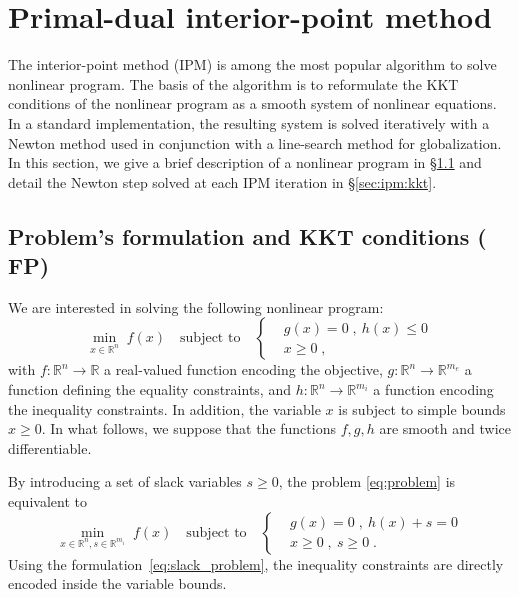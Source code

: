 \section{Primal-dual interior-point method}
The interior-point method (IPM) is among the most popular algorithm
to solve nonlinear program. The basis of the algorithm is to
reformulate the KKT conditions of the nonlinear program as a smooth
system of nonlinear equations. In a standard implementation, the
resulting system is solved iteratively with a Newton method used in conjunction
with a line-search method for globalization. In this section, we
give a brief description of a nonlinear program in \S\ref{sec:ipm:problem}
and detail the Newton step solved at each IPM iteration in \S\ref{sec:ipm:kkt}.

\subsection{Problem's formulation and KKT conditions ( FP)}
\label{sec:ipm:problem}
We are interested in solving the following nonlinear program:
\begin{equation}
  \label{eq:problem}
    \min_{x \in \mathbb{R}^n} \;  f(x)
\quad \text{subject to}\quad
\left\{
  \begin{aligned}
    & g(x) = 0 \; , ~ h(x) \leq 0 \\
      & x \geq 0  \; ,
  \end{aligned}
\right.
\end{equation}
with $f:\mathbb{R}^n \to \mathbb{R}$ a real-valued function
encoding the objective, $g: \mathbb{R}^n \to \mathbb{R}^{m_e}$
a function defining the equality constraints, and $h: \mathbb{R}^{n} \to
\mathbb{R}^{m_i}$ a function encoding the inequality constraints.
In addition, the variable $x$ is subject to simple bounds $x \geq 0$.
In what follows, we suppose that the functions $f, g, h$ are smooth
and twice differentiable.

By introducing a set of slack variables $s \geq 0$, the problem
\eqref{eq:problem} is equivalent to
\begin{equation}
  \label{eq:slack_problem}
    \min_{x \in \mathbb{R}^n, s \in \mathbb{R}^{m_i}} \;  f(x)
    \quad \text{subject to} \quad
    \left\{
  \begin{aligned}
    & g(x) = 0 \; , ~ h(x) + s = 0 \\
      & x \geq 0  \; , ~ s \geq 0  \; .
  \end{aligned}
  \right.
\end{equation}
Using the formulation~\eqref{eq:slack_problem}, the inequality constraints
are directly encoded inside the variable bounds.

